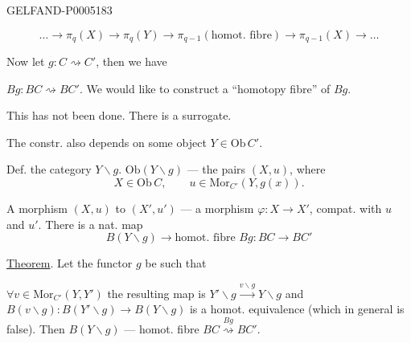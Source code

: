 \begin{GelfandAdjacentEvidence}{GELFAND-P000518}{3}

\[
\ldots\to\pi_q(X)\to\pi_q(Y)\to
\pi_{q-1}(\text{homot. fibre})\to\pi_{q-1}(X)\to\ldots
\]

Now let \underline{$g:C\rightsquigarrow C'$}, then we have

$Bg:BC\rightsquigarrow BC'$. We would like to construct a “homotopy fibre” of $Bg$.

This has not been done. There is a surrogate.

The constr. also depends on some object $Y\in\mathrm{Ob}\,C'$.

Def. the category $Y\backslash g$. $\mathrm{Ob}(Y\backslash g)$ — the pairs $(X,u)$, where
\[
X\in\mathrm{Ob}\,C,\qquad u\in\mathrm{Mor}_{C'}(Y,g(x)).
\]

A morphism $(X,u)$ to $(X',u')$ — a morphism $\varphi:X\to X'$,
compat. with $u$ and $u'$. There is a nat. map
\[
B(Y\backslash g)\to\text{homot. fibre }Bg:BC\to BC'
\]
\end{GelfandAdjacentEvidence}


\uline{Theorem}. Let the functor $g$ be such that

$\forall v\in\mathrm{Mor}_{C'}(Y,Y')$ the resulting map is
$Y'\backslash g\overset{v\backslash g}{\longrightarrow}Y\backslash g$
and $B(v\backslash g):B(Y'\backslash g)\to B(Y\backslash g)$ is a homot. equivalence
(which in general is false). Then $B(Y\backslash g)$ — homot. fibre
$BC\overset{Bg}{\rightsquigarrow}BC'$.


